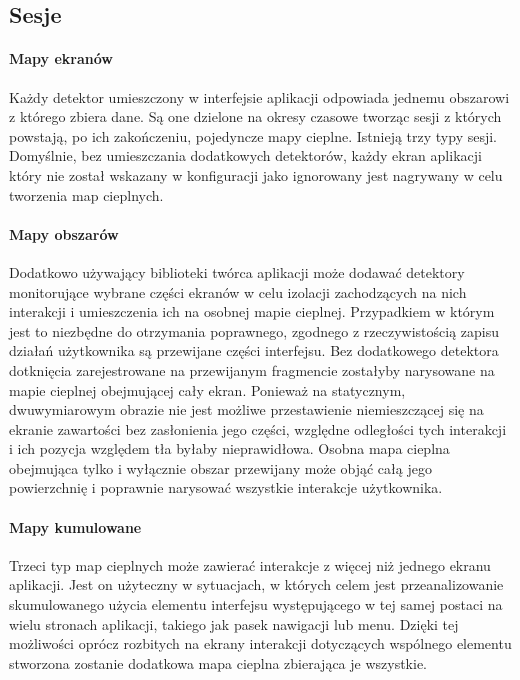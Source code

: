 \subsection{Sesje}


\paragraph{Mapy ekranów} Każdy detektor umieszczony w interfejsie aplikacji odpowiada jednemu obszarowi z którego zbiera dane. Są one dzielone na okresy czasowe tworząc sesji z których powstają, po ich zakończeniu, pojedyncze mapy cieplne. Istnieją trzy typy sesji. Domyślnie, bez umieszczania dodatkowych detektorów, każdy ekran aplikacji który nie został wskazany w konfiguracji jako ignorowany jest nagrywany w celu tworzenia map cieplnych.


\paragraph{Mapy obszarów} Dodatkowo używający biblioteki twórca aplikacji może dodawać detektory monitorujące wybrane części ekranów w celu izolacji zachodzących na nich interakcji i umieszczenia ich na osobnej mapie cieplnej. Przypadkiem w którym jest to niezbędne do otrzymania poprawnego, zgodnego z rzeczywistością zapisu działań użytkownika są przewijane części interfejsu. Bez dodatkowego detektora dotknięcia zarejestrowane na przewijanym fragmencie zostałyby narysowane na mapie cieplnej obejmującej cały ekran. Ponieważ na statycznym, dwuwymiarowym obrazie nie jest możliwe przestawienie niemieszczącej się na ekranie zawartości bez zasłonienia jego części, względne odległości tych interakcji i ich pozycja względem tła byłaby nieprawidłowa. Osobna mapa cieplna obejmująca tylko i wyłącznie obszar przewijany może objąć całą jego powierzchnię i poprawnie narysować wszystkie interakcje użytkownika.


\paragraph{Mapy kumulowane} Trzeci typ map cieplnych może zawierać interakcje z więcej niż jednego ekranu aplikacji. Jest on użyteczny w sytuacjach, w których celem jest przeanalizowanie skumulowanego użycia elementu interfejsu występującego w tej samej postaci na wielu stronach aplikacji, takiego jak pasek nawigacji lub menu. Dzięki tej możliwości oprócz rozbitych na ekrany interakcji dotyczących wspólnego elementu stworzona zostanie dodatkowa mapa cieplna zbierająca je wszystkie.

